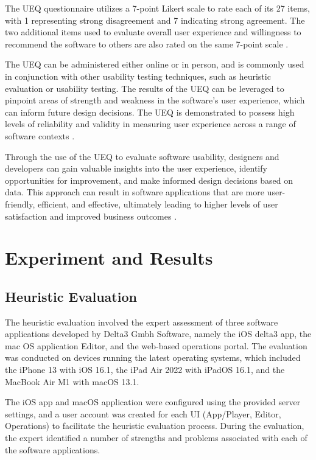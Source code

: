 \documentclass[conference,onecolumn]{IEEEtran}
\begin{document}
        The UEQ questionnaire utilizes a 7-point Likert scale to rate each of its 27 items, with 1 representing strong disagreement and 7 indicating strong agreement. The two additional items used to evaluate overall user experience and willingness to recommend the software to others are also rated on the same 7-point scale \cite{laugwitz2008construction}.

        The UEQ can be administered either online or in person, and is commonly used in conjunction with other usability testing techniques, such as heuristic evaluation or usability testing. The results of the UEQ can be leveraged to pinpoint areas of strength and weakness in the software's user experience, which can inform future design decisions. The UEQ is demonstrated to possess high levels of reliability and validity in measuring user experience across a range of software contexts \cite{hassenzahl2006user}.

        Through the use of the UEQ to evaluate software usability, designers and developers can gain valuable insights into the user experience, identify opportunities for improvement, and make informed design decisions based on data. This approach can result in software applications that are more user-friendly, efficient, and effective, ultimately leading to higher levels of user satisfaction and improved business outcomes \cite{brooke1996sus}.



\section{Experiment and Results}

    \subsection{Heuristic Evaluation}

        The heuristic evaluation involved the expert assessment of three software applications developed by Delta3 Gmbh Software, namely the iOS delta3 app, the mac OS application Editor, and the web-based operations portal. The evaluation was conducted on devices running the latest operating systems, which included the iPhone 13 with iOS 16.1, the iPad Air 2022 with iPadOS 16.1, and the MacBook Air M1 with macOS 13.1.

        The iOS app and macOS application were configured using the provided server settings, and a user account was created for each UI (App/Player, Editor, Operations) to facilitate the heuristic evaluation process. During the evaluation, the expert identified a number of strengths and problems associated with each of the software applications.
        
\end{document}
